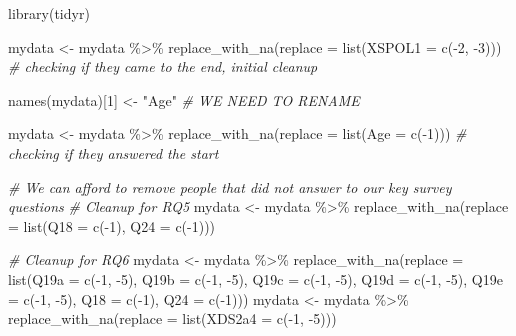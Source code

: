 \documentclass[
]{article}
\newenvironment{Shaded}{\begin{snugshade}}{\end{snugshade}}
\newcommand{\AttributeTok}[1]{\textcolor[rgb]{0.77,0.63,0.00}{#1}}
\newcommand{\CommentTok}[1]{\textcolor[rgb]{0.56,0.35,0.01}{\textit{#1}}}
\newcommand{\DecValTok}[1]{\textcolor[rgb]{0.00,0.00,0.81}{#1}}
\newcommand{\FunctionTok}[1]{\textcolor[rgb]{0.00,0.00,0.00}{#1}}
\newcommand{\NormalTok}[1]{#1}
\newcommand{\OtherTok}[1]{\textcolor[rgb]{0.56,0.35,0.01}{#1}}
\newcommand{\SpecialCharTok}[1]{\textcolor[rgb]{0.00,0.00,0.00}{#1}}
\newcommand{\StringTok}[1]{\textcolor[rgb]{0.31,0.60,0.02}{#1}}
\begin{document}
\begin{Shaded}
\begin{Highlighting}[]
\FunctionTok{library}\NormalTok{(tidyr)}

\NormalTok{mydata }\OtherTok{\textless{}{-}}\NormalTok{ mydata }\SpecialCharTok{\%\textgreater{}\%} \FunctionTok{replace\_with\_na}\NormalTok{(}\AttributeTok{replace =} \FunctionTok{list}\NormalTok{(}\AttributeTok{XSPOL1 =} \FunctionTok{c}\NormalTok{(}\SpecialCharTok{{-}}\DecValTok{2}\NormalTok{, }\SpecialCharTok{{-}}\DecValTok{3}\NormalTok{))) }\CommentTok{\# checking if they came to the end, initial cleanup}

\FunctionTok{names}\NormalTok{(mydata)[}\DecValTok{1}\NormalTok{] }\OtherTok{\textless{}{-}} \StringTok{"Age"} \CommentTok{\# WE NEED TO RENAME}

\NormalTok{mydata }\OtherTok{\textless{}{-}}\NormalTok{ mydata }\SpecialCharTok{\%\textgreater{}\%} \FunctionTok{replace\_with\_na}\NormalTok{(}\AttributeTok{replace =} \FunctionTok{list}\NormalTok{(}\AttributeTok{Age =} \FunctionTok{c}\NormalTok{(}\SpecialCharTok{{-}}\DecValTok{1}\NormalTok{))) }\CommentTok{\# checking if they answered the start}

\CommentTok{\# We can afford to remove people that did not answer to our key survey questions}
\CommentTok{\# Cleanup for RQ5}
\NormalTok{mydata }\OtherTok{\textless{}{-}}\NormalTok{ mydata }\SpecialCharTok{\%\textgreater{}\%} \FunctionTok{replace\_with\_na}\NormalTok{(}\AttributeTok{replace =} \FunctionTok{list}\NormalTok{(}\AttributeTok{Q18 =} \FunctionTok{c}\NormalTok{(}\SpecialCharTok{{-}}\DecValTok{1}\NormalTok{), }\AttributeTok{Q24 =} \FunctionTok{c}\NormalTok{(}\SpecialCharTok{{-}}\DecValTok{1}\NormalTok{)))}

\CommentTok{\# Cleanup for RQ6}
\NormalTok{mydata }\OtherTok{\textless{}{-}}\NormalTok{ mydata }\SpecialCharTok{\%\textgreater{}\%} \FunctionTok{replace\_with\_na}\NormalTok{(}\AttributeTok{replace =} \FunctionTok{list}\NormalTok{(}\AttributeTok{Q19a =} \FunctionTok{c}\NormalTok{(}\SpecialCharTok{{-}}\DecValTok{1}\NormalTok{, }\SpecialCharTok{{-}}\DecValTok{5}\NormalTok{), }\AttributeTok{Q19b =} \FunctionTok{c}\NormalTok{(}\SpecialCharTok{{-}}\DecValTok{1}\NormalTok{, }\SpecialCharTok{{-}}\DecValTok{5}\NormalTok{), }\AttributeTok{Q19c =} \FunctionTok{c}\NormalTok{(}\SpecialCharTok{{-}}\DecValTok{1}\NormalTok{, }\SpecialCharTok{{-}}\DecValTok{5}\NormalTok{), }\AttributeTok{Q19d =} \FunctionTok{c}\NormalTok{(}\SpecialCharTok{{-}}\DecValTok{1}\NormalTok{, }\SpecialCharTok{{-}}\DecValTok{5}\NormalTok{), }\AttributeTok{Q19e =} \FunctionTok{c}\NormalTok{(}\SpecialCharTok{{-}}\DecValTok{1}\NormalTok{, }\SpecialCharTok{{-}}\DecValTok{5}\NormalTok{), }\AttributeTok{Q18 =} \FunctionTok{c}\NormalTok{(}\SpecialCharTok{{-}}\DecValTok{1}\NormalTok{), }\AttributeTok{Q24 =} \FunctionTok{c}\NormalTok{(}\SpecialCharTok{{-}}\DecValTok{1}\NormalTok{)))}
\NormalTok{mydata }\OtherTok{\textless{}{-}}\NormalTok{ mydata }\SpecialCharTok{\%\textgreater{}\%} \FunctionTok{replace\_with\_na}\NormalTok{(}\AttributeTok{replace =} \FunctionTok{list}\NormalTok{(}\AttributeTok{XDS2a4 =} \FunctionTok{c}\NormalTok{(}\SpecialCharTok{{-}}\DecValTok{1}\NormalTok{, }\SpecialCharTok{{-}}\DecValTok{5}\NormalTok{)))}


\end{Highlighting}
\end{Shaded}
\end{document}
